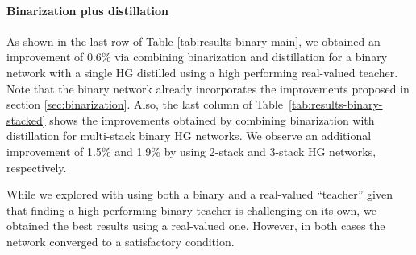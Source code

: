 \documentclass[10pt,twocolumn,letterpaper]{article}
\begin{document}
\paragraph{Binarization plus distillation}
As shown in the last row of Table \ref{tab:results-binary-main}, we obtained an improvement of 0.6\% via combining binarization and distillation for a binary network with a single HG distilled using a high performing real-valued teacher. Note that the binary network already incorporates the improvements proposed in section \ref{sec:binarization}. Also, the last column of Table~\ref{tab:results-binary-stacked} shows the improvements obtained by combining binarization with distillation for multi-stack binary HG networks. We observe an additional improvement of 1.5\% and 1.9\% by using 2-stack and 3-stack HG networks, respectively.

While we explored with using both a binary and a real-valued ``teacher'' given that finding a high performing binary teacher is challenging on its own, we obtained the best results using a real-valued one. However, in both cases the network converged to a satisfactory condition.
\end{document}

